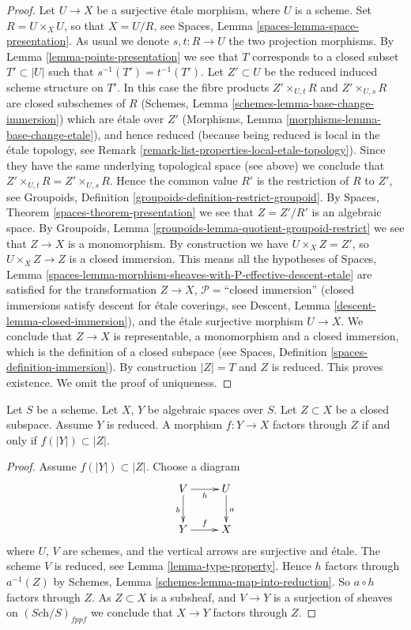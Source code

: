 \begin{proof}
Let $U \to X$ be a surjective \'etale morphism, where $U$ is a scheme.
Set $R = U \times_X U$, so that $X = U/R$, see
Spaces, Lemma \ref{spaces-lemma-space-presentation}.
As usual we denote $s, t : R \to U$ the two projection morphisms.
By Lemma \ref{lemma-points-presentation}
we see that $T$ corresponds to a closed subset $T' \subset |U|$ such
that $s^{-1}(T') = t^{-1}(T')$.
Let $Z' \subset U$ be the reduced induced scheme structure on $T'$.
In this case the fibre products
$Z' \times_{U, t} R$ and $Z' \times_{U, s} R$ are closed subschemes
of $R$
(Schemes, Lemma \ref{schemes-lemma-base-change-immersion})
which are \'etale over $Z'$
(Morphisms, Lemma \ref{morphisms-lemma-base-change-etale}),
and hence reduced
(because being reduced is local in the \'etale topology, see
Remark \ref{remark-list-properties-local-etale-topology}).
Since they have the same underlying topological space (see above)
we conclude that $Z' \times_{U, t} R = Z' \times_{U, s} R$.
Hence the common value $R'$ is the restriction of $R$ to $Z'$, see
Groupoids, Definition \ref{groupoids-definition-restrict-groupoid}. By
Spaces, Theorem \ref{spaces-theorem-presentation} we see that
$Z = Z'/R'$ is an algebraic space. By
Groupoids, Lemma \ref{groupoids-lemma-quotient-groupoid-restrict}
we see that $Z \to X$ is a monomorphism. By construction we have
$U \times_X Z = Z'$, so $U \times_X Z \to Z$ is a closed immersion.
This means all the hypotheses of
Spaces,
Lemma \ref{spaces-lemma-morphism-sheaves-with-P-effective-descent-etale}
are satisfied
for the transformation $Z \to X$, $\mathcal{P}=$``closed immersion'' (closed
immersions satisfy descent for \'etale coverings, see
Descent, Lemma \ref{descent-lemma-closed-immersion}),
and the \'etale surjective morphism $U \to X$. We conclude that $Z \to X$
is representable, a monomorphism and a closed immersion, which is the
definition of a closed subspace (see
Spaces, Definition \ref{spaces-definition-immersion}). By construction
$|Z| = T$ and $Z$ is reduced. This proves existence. We omit the proof
of uniqueness.
\end{proof}

\begin{lemma}
\label{lemma-map-into-reduction}
Let $S$ be a scheme.
Let $X$, $Y$ be algebraic spaces over $S$.
Let $Z \subset X$ be a closed subspace.
Assume $Y$ is reduced.
A morphism $f : Y \to X$ factors through $Z$ if and only if
$f(|Y|) \subset |Z|$.
\end{lemma}

\begin{proof}
Assume $f(|Y|) \subset |Z|$. Choose a diagram
$$
\xymatrix{
V \ar[d]_b \ar[r]_h & U \ar[d]^a \\
Y \ar[r]^f & X
}
$$
where $U$, $V$ are schemes, and the vertical arrows are surjective and
\'etale. The scheme $V$ is reduced, see
Lemma \ref{lemma-type-property}.
Hence $h$ factors through $a^{-1}(Z)$ by
Schemes, Lemma \ref{schemes-lemma-map-into-reduction}.
So $a \circ h$ factors through $Z$.
As $Z \subset X$ is a subsheaf, and $V \to Y$ is a surjection of sheaves
on $(\textit{Sch}/S)_{fppf}$ we conclude that $X \to Y$ factors
through $Z$.
\end{proof}

